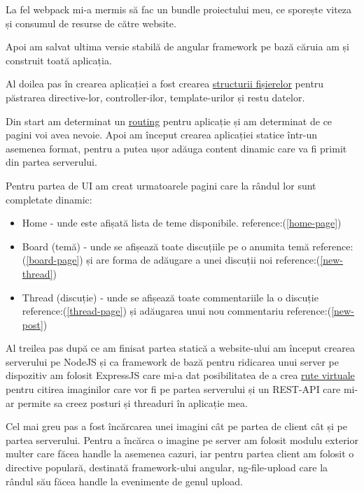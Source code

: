 La fel webpack mi-a mermis să fac un bundle proiectului meu, ce sporește viteza și consumul de resurse de către website.

Apoi am salvat ultima versie stabilă de angular\cite{angular} framework pe bază căruia am și construit toată aplicația.

Al doilea pas în crearea aplicației a fost crearea \href{https://github.com/AScripnic/MIDPS-laboratories/tree/master/Lab%233/website/app}{structurii fișierelor} pentru păstrarea directive-lor, controller-ilor, template-urilor și restu datelor.

Din start am determinat un \href{https://github.com/AScripnic/MIDPS-laboratories/blob/master/Lab%233/website/app/module/ng-routes.js}{routing} pentru aplicație și am determinat de ce pagini voi avea nevoie. Apoi am început crearea aplicației statice într-un asemenea format, pentru a putea ușor adăuga content dinamic care va fi primit din partea serverului.

Pentru partea de UI am creat urmatoarele pagini care la rândul lor sunt completate dinamic:
\begin{itemize}
	\item Home - unde este afișată lista de teme disponibile. reference:(\ref{home-page})
	\item Board (temă) - unde se afișează toate discuțiile pe o anumita temă reference:(\ref{board-page}) și are forma de adăugare a unei discuții noi reference:(\ref{new-thread})
	\item Thread (discuție) - unde se afișează toate commentariile la o discuție reference:(\ref{thread-page}) și adăugarea unui nou commentariu reference:(\ref{new-post})
\end{itemize}

Al treilea pas după ce am finisat partea statică a website-ului am început crearea serverului pe NodeJS\cite{nodejs} și ca framework de bază pentru ridicarea unui server pe dispozitiv am folosit ExpressJS\cite{expressjs} care mi-a dat posibilitatea de a crea \href{https://github.com/AScripnic/MIDPS-laboratories/blob/master/Lab%233/server/app.js#L22}{rute virtuale} pentru citirea imaginilor care vor fi pe partea serverului și un REST-API care mi-ar permite sa creez posturi și threaduri în aplicație mea.

Cel mai greu pas a fost încărcarea unei imagini cât pe partea de client cât și pe partea serverului. Pentru a încărca o imagine pe server am folosit modulu exterior multer\cite{multer} care făcea handle la asemenea cazuri, iar pentru partea client am folosit o directive populară, destinată framework-ului angular, ng-file-upload\cite{file-upload} care la rândul său făcea handle la evenimente de genul upload.

